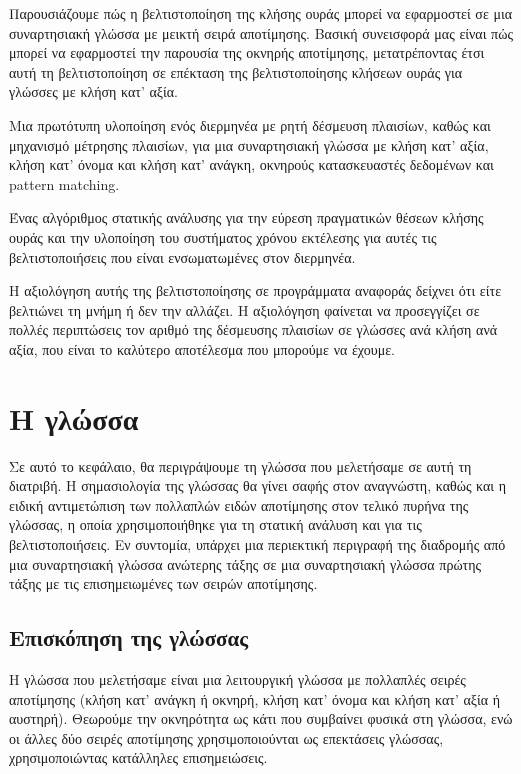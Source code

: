 \documentclass[diploma]{softlab-thesis}
\begin{document}
Παρουσιάζουμε πώς η βελτιστοποίηση της κλήσης ουράς μπορεί να εφαρμοστεί σε μια συναρτησιακή 
γλώσσα με μεικτή σειρά αποτίμησης. Βασική συνεισφορά μας είναι πώς μπορεί να εφαρμοστεί
την παρουσία της οκνηρής αποτίμησης, μετατρέποντας έτσι αυτή τη βελτιστοποίηση σε επέκταση της 
βελτιστοποίησης κλήσεων ουράς για γλώσσες με κλήση κατ' αξία.

Μια πρωτότυπη υλοποίηση ενός διερμηνέα με ρητή δέσμευση πλαισίων, καθώς και μηχανισμό μέτρησης 
πλαισίων, για μια συναρτησιακή γλώσσα με κλήση κατ' αξία, κλήση κατ' όνομα και κλήση κατ' ανάγκη, οκνηρούς 
κατασκευαστές δεδομένων και pattern matching.

Ένας αλγόριθμος στατικής ανάλυσης για την εύρεση πραγματικών θέσεων κλήσης ουράς 
και την υλοποίηση του συστήματος χρόνου εκτέλεσης για αυτές τις βελτιστοποιήσεις που είναι 
ενσωματωμένες στον διερμηνέα.

Η αξιολόγηση αυτής της βελτιστοποίησης σε προγράμματα αναφοράς δείχνει ότι είτε βελτιώνει 
τη μνήμη ή δεν την αλλάζει. Η αξιολόγηση φαίνεται να προσεγγίζει σε πολλές περιπτώσεις τον αριθμό της
δέσμευσης πλαισίων σε γλώσσες ανά κλήση ανά αξία, που είναι το καλύτερο αποτέλεσμα που μπορούμε να έχουμε.

%

\chapter{Η γλώσσα}

Σε αυτό το κεφάλαιο, θα περιγράψουμε τη γλώσσα που μελετήσαμε σε αυτή τη διατριβή.
Η σημασιολογία της γλώσσας θα γίνει σαφής στον αναγνώστη, καθώς και
η ειδική αντιμετώπιση των πολλαπλών ειδών αποτίμησης στον τελικό πυρήνα της
γλώσσας, η οποία χρησιμοποιήθηκε για τη στατική ανάλυση και για τις βελτιστοποιήσεις. Εν συντομία, 
υπάρχει μια
περιεκτική περιγραφή της διαδρομής από μια συναρτησιακή γλώσσα ανώτερης τάξης
σε μια συναρτησιακή γλώσσα πρώτης τάξης με τις επισημειωμένες των σειρών αποτίμησης.

\section{Επισκόπηση της γλώσσας}

Η γλώσσα που μελετήσαμε είναι μια λειτουργική γλώσσα
με πολλαπλές σειρές αποτίμησης (κλήση κατ' ανάγκη ή
οκνηρή, κλήση κατ' όνομα και κλήση κατ' αξία ή αυστηρή).
Θεωρούμε την οκνηρότητα ως κάτι που συμβαίνει φυσικά στη γλώσσα, ενώ
οι άλλες δύο σειρές αποτίμησης χρησιμοποιούνται ως επεκτάσεις γλώσσας,
χρησιμοποιώντας κατάλληλες επισημειώσεις.
\end{document}
